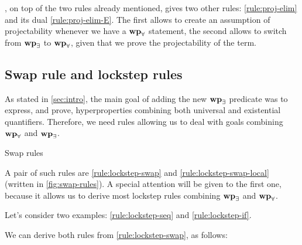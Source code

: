 , on top of the two rules already mentioned, gives two other rules: \cref{rule:proj-elim} and its dual \cref{rule:proj-elim-E}. The first allows to create an assumption of projectability whenever we have a $\mathbf{wp}_{\forall}$ statement, the second allows to switch from $\mathbf{wp}_{\exists}$ to $\mathbf{wp}_{\forall}$, given that we prove the projectability of the term.

\subsection{Swap rule and lockstep rules}

As stated in \cref{sec:intro}, the main goal of adding the new $\mathbf{wp}_{\exists}$ predicate was to express, and prove, hyperproperties combining both universal and existential quantifiers. Therefore, we need rules allowing us to deal with goals combining $\mathbf{wp}_{\forall}$ and $\mathbf{wp}_{\exists}$.

\begin{mathfig}{\small}
    \begin{proofrules}        
        
        \label{rule:lockstep-swap}

        
        \label{rule:lockstep-swap-local}
    \end{proofrules}
    \caption{Swap rules}
    \label{fig:swap-rules}
\end{mathfig}

A pair of such rules are \cref{rule:lockstep-swap} and \cref{rule:lockstep-swap-local} (written in \cref{fig:swap-rules}). A special attention will be given to the first one, because it allows us to derive most lockstep rules combining $\mathbf{wp}_{\exists}$ and $\mathbf{wp}_{\forall}$.

Let's consider two examples: \cref{rule:lockstep-seq} and \cref{rule:lockstep-if}.

\resizebox{0.8\width}{!}{
    \begin{proofrules}
        
        \label{rule:lockstep-seq}

        
        \label{rule:lockstep-if}
    \end{proofrules}
    }

    \bigskip

    We can derive both rules from \cref{rule:lockstep-swap}, as follows:

    \bigskip


